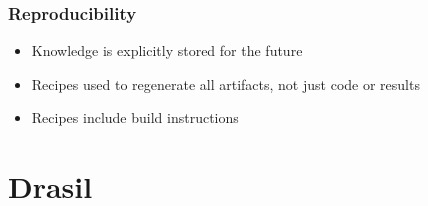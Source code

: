 \documentclass{beamer}
\begin{document}

\begin{frame}

\frametitle{Reproducibility}

\begin{itemize}
\item Knowledge is explicitly stored for the future
\item Recipes used to regenerate all artifacts, not just code or results
\item Recipes include build instructions
\end{itemize}
\end{frame}







\section[Drasil]{Drasil}

\end{document}
